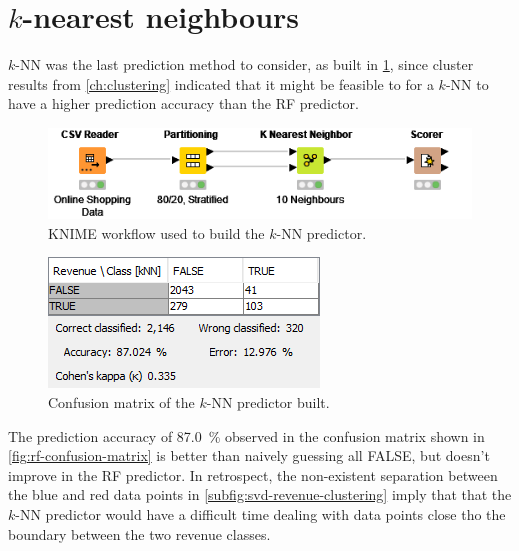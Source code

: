 \documentclass[../cmpe-251-project-report.tex]{subfiles}
\begin{document}
  \section{\(k\)-nearest neighbours}
  \(k\)-NN was the last prediction method to consider, as built in \cref{fig:knn-workflow}, since cluster results from \cref{ch:clustering} indicated that it might be feasible to for a \(k\)-NN to have a higher prediction accuracy than the RF predictor.
  \begin{figure}
    \includegraphics{img/knn-workflow.png}
    \caption{KNIME workflow used to build the \(k\)-NN predictor.}
    \label{fig:knn-workflow}
  \end{figure}
  \begin{figure}
    \includegraphics{img/knn-confusion-matrix.png}
    \caption{Confusion matrix of the \(k\)-NN predictor built.}
    \label{fig:knn-confusion-matrix}
  \end{figure}
  The prediction accuracy of \qty{87.0}{\percent} observed in the confusion matrix shown in \cref{fig:rf-confusion-matrix} is better than naively guessing all FALSE, but doesn't improve in the RF predictor. In retrospect, the non-existent separation between the blue and red data points in \cref{subfig:svd-revenue-clustering} imply that that the \(k\)-NN predictor would have a difficult time dealing with data points close tho the boundary between the two revenue classes.
\end{document}
